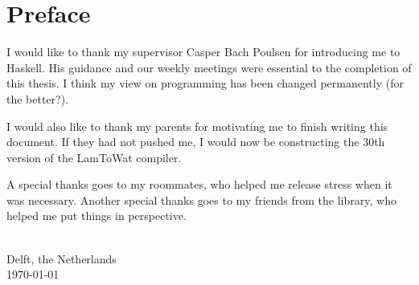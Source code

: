 
\chapter{\label{chap:Preface}Preface}

I would like to thank my supervisor Casper Bach Poulsen for introducing me to Haskell. His guidance and our weekly meetings were essential to the completion of this thesis. I think my view on programming has been changed permanently (for the better?).

I would also like to thank my parents for motivating me to finish writing this document. If they had not pushed me, I would now be constructing the 30th version of the LamToWat compiler.

A special thanks goes to my roommates, who helped me release stress when it was necessary. Another special thanks goes to my friends from the library, who helped me put things in perspective.

\vspace{1cm}
\begin{flushright}
\theauthor{}\\
Delft, the Netherlands\\
\today{}\\
\end{flushright}
